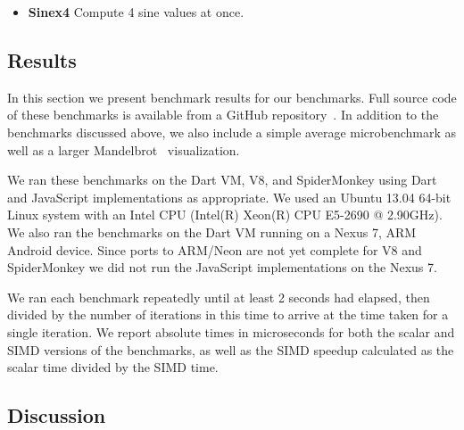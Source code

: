\documentclass{sigplanconf}
\begin{document}
\begin{itemize}
\begin{itemize}
\item \textbf{Sinex4} Compute 4 sine values at once.
\end{itemize}

\end{itemize}

\subsection{Results}

In this section we present benchmark results for our benchmarks.
%
Full source code of these benchmarks is available from a GitHub
repository~\cite{benchmarks}.
%
In addition to the benchmarks discussed above, we also include a simple average
microbenchmark as well as a larger Mandelbrot~\cite{mandelbrot} visualization.

We ran these benchmarks on the Dart VM, V8, and SpiderMonkey using Dart and
JavaScript implementations as appropriate.
%
We used an Ubuntu 13.04 64-bit Linux system with an Intel CPU
(Intel(R) Xeon(R) CPU E5-2690 @ 2.90GHz).
%
We also ran the benchmarks on the Dart VM running on a Nexus 7, ARM Android
device.
%
Since ports to ARM/Neon are not yet complete for V8 and SpiderMonkey we did not
run the JavaScript implementations on the Nexus 7.


We ran each benchmark repeatedly until at least 2 seconds had elapsed, then
divided by the number of iterations in this time to arrive at the time taken
for a single iteration.
%
We report absolute times in microseconds for both the scalar and SIMD versions
of the benchmarks, as well as the SIMD speedup calculated as the scalar time
divided by the SIMD time.


\subsection{Discussion}
\end{document}
